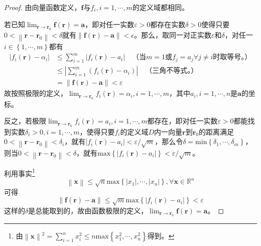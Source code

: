 \documentclass[main.tex]{subfiles}
\begin{document}
\begin{proof}
    由向量函数定义，$\mathbf{f}$与$f_i,i=1,\cdots,m$的定义域都相同。

    若已知$\lim_{\mathbf{r}\to\mathbf{r}_0}\mathbf{f}\left(\mathbf{r}\right)=\mathbf{a}$，即对任一实数$\varepsilon>0$都存在实数$\delta>0$使得只要$0<\left\|\mathbf{r}-\mathbf{r}_0\right\|<\delta$就有$\left\|\mathbf{f}\left(\mathbf{r}\right)-\mathbf{a}\right\|<\epsilon$。那么，取同一对正实数$\varepsilon$和$\delta$，对任一$i\in\left\{1,\cdots,m\right\}$都有
    \begin{align*}
        \left|f_i\left(\mathbf{r}\right)-\alpha_i\right| & \leq\sum_{i=1}^m\left|f_i\left(\mathbf{r}\right)-a_i\right|\quad\text{（当}m=1\text{或}f_j=a_j\forall j\neq i\text{时取等号。）} \\
                                                         & \leq\left|\sum_{i=1}^m\left(f_i\left(\mathbf{r}\right)-\alpha_i\right)\right|\quad\text{（三角不等式。）}                       \\
                                                         & =\left\|\mathbf{f}\left(\mathbf{r}\right)-\mathbf{a}\right\|<\varepsilon
    \end{align*}
    故按照极限的定义，$\lim_{\mathbf{r}\to\mathbf{r}_0}f_i\left(\mathbf{r}\right)=\alpha_i,i=1,\cdots,m$，其中$a_i,i=1,\cdots,n$是$\mathbf{a}$的坐标。

    反之，若极限$\lim_{\mathbf{r}\to\mathbf{r}_0}f_i\left(\mathbf{r}\right)=a_i,i=1,\cdots,m$都存在，即对任一实数$\varepsilon>0$都能找到实数$\delta_i>0,i=1,\cdots,m$，使得只要$f_i$的定义域$D$内一向量$\mathbf{r}$到$\mathbf{r}_0$的距离满足$0<\left\|\mathbf{r}-\mathbf{r}_0\right\|<\delta_i$，就有$\left|f_i\left(\mathbf{r}\right)-a_i\right|<\varepsilon/\sqrt{m}$，那么令$\delta=\mathrm{min}\left\{\delta_1,\cdots,\delta_m\right\}$，则当$0<\left\|\mathbf{r}-\mathbf{r}_0\right\|<\delta$，就有$\mathrm{max}\left\{\left|f_i\left(\mathbf{r}\right)-a_i\right|\right\}<\varepsilon/\sqrt{m}$。

    利用事实\footnote{
        由$\left\|\mathbf{x}\right\|^2=\sum_{i=1}^nx_i^2\leq n\mathrm{max}\left\{x_1^2,\cdots,x_n^2\right\}$得到。
    }
    \[\left\|\mathbf{x}\right\|\leq\sqrt{n}\mathrm{max}\left\{\left|x_1\right|,\cdots,\left|x_n\right|\right\},\forall\mathbf{x}\in\mathbb{R}^n\]
    可得
    \[\left\|\mathbf{f}\left(\mathbf{r}\right)-\mathbf{a}\right\|\leq\sqrt{m}\mathrm{max}\left\{\left|f_i\left(\mathbf{r}\right)-a_i\right|\right\}<\varepsilon\]
    这样的$\delta$是总能取到的，故由函数极限的定义，$\lim_{\mathbf{r}\to\mathbf{r}_0}\mathbf{f}\left(\mathbf{r}\right)=\mathbf{a}$。
\end{proof}
\end{document}
